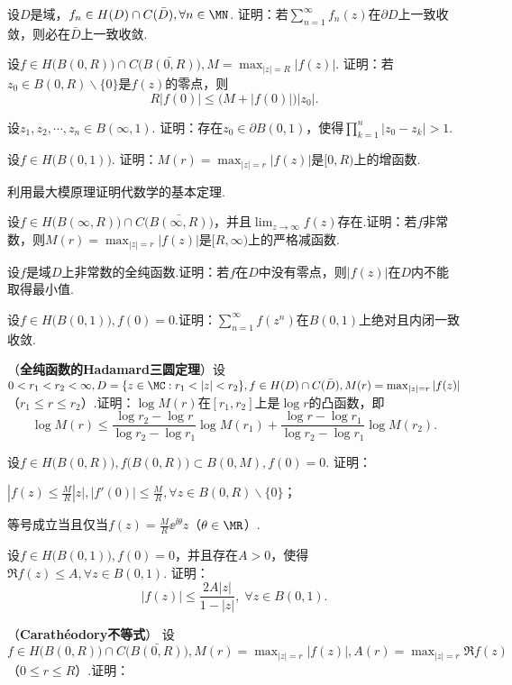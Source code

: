\begin{xiti}
\item 设$D$是域，$f_n\in H(D)\cap C(\bar D),\forall n\in \MN$. 证明：若$\sum_{n=1}^\infty f_n(z)$在$\partial D$上一致收敛，则必在$\bar D$上一致收敛.
\item 设$f\in H\big(B(0,R)\big)\cap C\big(\bar{B(0,R)}\big),M=\max_{|z|=R}|f(z)|$. 证明：若$z_0\in B(0,R)\backslash\{0\}$是$f(z)$的零点，则
    \[R|f(0)|\le\big(M+|f(0)|\big)|z_0|.\]
\item 设$z_1,z_2,\cdots,z_n\in B(\infty,1)$. 证明：存在$z_0\in \partial B(0,1)$，使得$\prod_{k=1}^n|z_0-z_k|>1$.
\item 设$f\in H\big(B(0,1)\big)$. 证明：$M(r)=\max_{|z|=r}|f(z)|$是$[0,R)$上的增函数.
\item 利用最大模原理证明代数学的基本定理.
\item 设$f\in H\big(B(\infty,R)\big)\cap C\big(\bar{B(\infty,R)}\big)$，并且$\lim_{z\to\infty}f(z)$存在.证明：若$f$非常数，则$M(r)=\max_{|z|=r}|f(z)|$是$[R,\infty)$上的严格减函数.
\item 设$f$是域$D$上非常数的全纯函数.证明：若$f$在$D$中没有零点，则$|f(z)|$在$D$内不能取得最小值.
\item 设$f\in H\big(B(0,1)\big),f(0)=0$.证明：$\sum_{n=1}^\infty f(z^n)$在$B(0,1)$上绝对且内闭一致收敛.
\item （\textbf{全纯函数的Hadamard三圆定理}）设$0<r_1<r_2<\infty,D=\{z\in \MC:r_1<|z|<r_2\},f\in H(D)\cap C(\bar D),M(r)=
    \max_{|z|=r}|f(z)|$（$r_1\le r\le r_2$）.证明：$\log M(r)$在$[r_1,r_2]$上是$\log r$的凸函数，即
    \[\log M(r)\le\frac{\log r_2-\log r}{\log r_2-\log r_1}\log M(r_1)
    +\frac{\log r-\log r_1}{\log r_2-\log r_1}\log M(r_2).\]
\item 设$f\in H\big(B(0,R)\big),f\big(B(0,R)\big)\subset B(0,M),f(0)=0$. 证明：
\begin{enuma}
  \item $|f(z)\le\frac MR|z|,|f'(0)|\le \frac MR,\forall z\in B(0,R)\backslash\{0\}$；
  \item 等号成立当且仅当$f(z)=\frac MR\ee^{\ii\theta}z$（$\theta\in\MR$）.
\end{enuma}
\item 设$f\in H\big(B(0,1)\big),f(0)=0$，并且存在$A>0$，使得$\Re f(z)\le A,\forall z\in B(0,1)$. 证明：
    \[|f(z)|\le\frac{2A|z|}{1-|z|},\;\forall z\in B(0,1).\]
\item （\textbf{Carath\'eodory不等式}）
设$f\in H\big(B(0,R)\big)\cap C\big(\bar{B(0,R)}\big),M(r)=\max_{|z|=r}|f(z)|,A(r)=\max_{|z|=r}\Re f(z)$（$0\le r\le R$）.证明：

\end{xiti}
